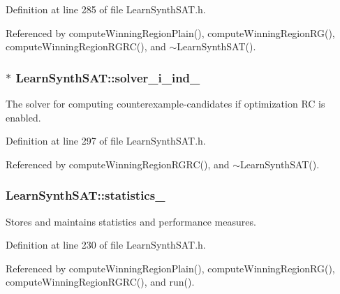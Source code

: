 Definition at line 285 of file Learn\-Synth\-S\-A\-T.\-h.



Referenced by compute\-Winning\-Region\-Plain(), compute\-Winning\-Region\-R\-G(), compute\-Winning\-Region\-R\-G\-R\-C(), and $\sim$\-Learn\-Synth\-S\-A\-T().

\hypertarget{classLearnSynthSAT_ae7f4a4e3546f46ad1256e203311226cf}{
\subsubsection[{solver\-\_\-i\-\_\-ind\-\_\-}]{$\ast$ Learn\-Synth\-S\-A\-T\-::solver\-\_\-i\-\_\-ind\-\_\-\hspace{0.3cm}{\ttfamily [protected]}}}\label{classLearnSynthSAT_ae7f4a4e3546f46ad1256e203311226cf}


The solver for computing counterexample-\/candidates if optimization R\-C is enabled. 



Definition at line 297 of file Learn\-Synth\-S\-A\-T.\-h.



Referenced by compute\-Winning\-Region\-R\-G\-R\-C(), and $\sim$\-Learn\-Synth\-S\-A\-T().

\hypertarget{classLearnSynthSAT_a2175c687276e00fa0fe3e158680affc1}{
\subsubsection[{statistics\-\_\-}]{ Learn\-Synth\-S\-A\-T\-::statistics\-\_\-\hspace{0.3cm}{\ttfamily [protected]}}}\label{classLearnSynthSAT_a2175c687276e00fa0fe3e158680affc1}


Stores and maintains statistics and performance measures. 



Definition at line 230 of file Learn\-Synth\-S\-A\-T.\-h.



Referenced by compute\-Winning\-Region\-Plain(), compute\-Winning\-Region\-R\-G(), compute\-Winning\-Region\-R\-G\-R\-C(), and run().

